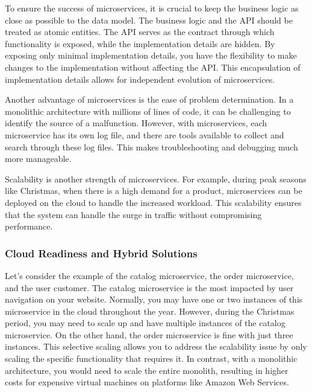 To ensure the success of microservices, it is crucial to keep the
business logic as close as possible to the data model. The business
logic and the API should be treated as atomic entities. The API serves
as the contract through which functionality is exposed, while the
implementation details are hidden. By exposing only minimal
implementation details, you have the flexibility to make changes to the
implementation without affecting the API. This encapsulation of
implementation details allows for independent evolution of
microservices.

Another advantage of microservices is the ease of problem determination.
In a monolithic architecture with millions of lines of code, it can be
challenging to identify the source of a malfunction. However, with
microservices, each microservice has its own log file, and there are
tools available to collect and search through these log files. This
makes troubleshooting and debugging much more manageable.

Scalability is another strength of microservices. For example, during
peak seasons like Christmas, when there is a high demand for a product,
microservices can be deployed on the cloud to handle the increased
workload. This scalability ensures that the system can handle the surge
in traffic without compromising performance.

\subsubsection{Cloud Readiness and Hybrid Solutions}

Let's consider the example of the catalog microservice, the order
microservice, and the user customer. The catalog microservice is the
most impacted by user navigation on your website. Normally, you may have
one or two instances of this microservice in the cloud throughout the
year. However, during the Christmas period, you may need to scale up and
have multiple instances of the catalog microservice. On the other hand,
the order microservice is fine with just three instances. This selective
scaling allows you to address the scalability issue by only scaling the
specific functionality that requires it. In contrast, with a monolithic
architecture, you would need to scale the entire monolith, resulting in
higher costs for expensive virtual machines on platforms like Amazon Web
Services.

